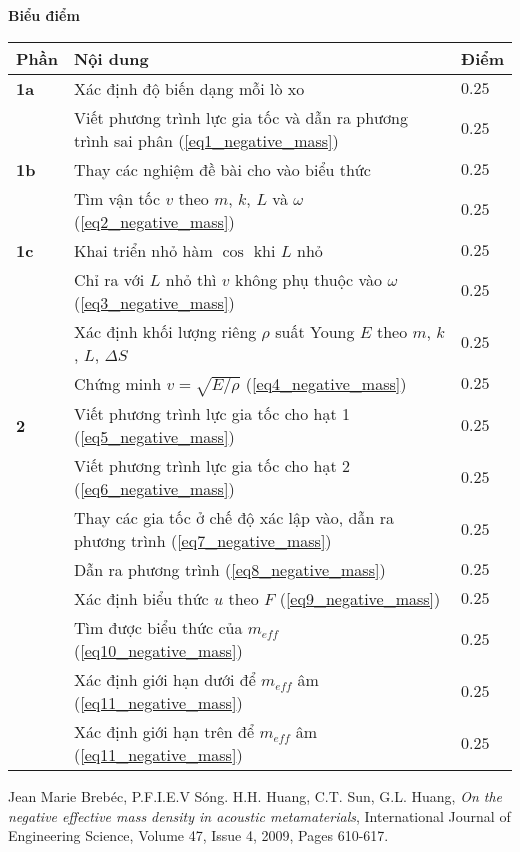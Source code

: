 \textbf{Biểu điểm}
\begin{center}
\begin{tabular}{|>{\centering\arraybackslash}m{1cm}|>{\raggedright\arraybackslash}m{14cm}| >{\centering\arraybackslash}m{1cm}|}
    \hline
    \textbf{Phần} & \textbf{Nội dung} & \textbf{Điểm} \\
    \hline
    \textbf{1a} & Xác định độ biến dạng mỗi lò xo & $0.25$ \\
    \cline{2-3}
    & Viết phương trình lực gia tốc và dẫn ra phương trình sai phân (\ref{eq1_negative_mass}) & $0.25$ \\
    \hline
    \textbf{1b} & Thay các nghiệm đề bài cho vào biểu thức & $0.25$ \\
    \cline{2-3} 
    & Tìm vận tốc $v$ theo $m$, $k$, $L$ và $\omega$ (\ref{eq2_negative_mass}) & $0.25$ \\
    \hline
    \textbf{1c} & Khai triển nhỏ hàm $\cos$ khi $L$ nhỏ & $0.25$ \\
    \cline{2-3}
    & Chỉ ra với $L$ nhỏ thì $v$ không phụ thuộc vào $\omega$ (\ref{eq3_negative_mass}) & $0.25$ \\
    \cline{2-3}
    & Xác định khối lượng riêng $\rho$ suất Young $E$ theo $m$, $k$, $L$, $\Delta S$ & $0.25$ \\
    \cline{2-3}
    & Chứng minh $v=\sqrt{E/\rho}$ (\ref{eq4_negative_mass}) & $0.25$ \\
    \hline
    \textbf{2} & Viết phương trình lực gia tốc cho hạt 1 (\ref{eq5_negative_mass}) & $0.25$ \\
    \cline{2-3}
    & Viết phương trình lực gia tốc cho hạt 2 (\ref{eq6_negative_mass}) & $0.25$ \\
    \cline{2-3}
    & Thay các gia tốc ở chế độ xác lập vào, dẫn ra phương trình (\ref{eq7_negative_mass}) & $0.25$ \\
    \cline{2-3}
    & Dẫn ra phương trình (\ref{eq8_negative_mass}) & $0.25$ \\ 
    \cline{2-3}
    & Xác định biểu thức $u$ theo $F$ (\ref{eq9_negative_mass}) & $0.25$ \\
    \cline{2-3} 
    & Tìm được biểu thức của $m_{eff}$ (\ref{eq10_negative_mass}) & $0.25$ \\
    \cline{2-3}
    & Xác định giới hạn dưới để $m_{eff}$ âm (\ref{eq11_negative_mass}) & $0.25$ \\
    \cline{2-3}
    & Xác định giới hạn trên để $m_{eff}$ âm (\ref{eq11_negative_mass}) & $0.25$ \\
    \hline
\end{tabular}
\end{center}


\begin{thebibliography}{}
 Jean Marie Brebéc, P.F.I.E.V Sóng.
 H.H. Huang, C.T. Sun, G.L. Huang, \textit{On the negative effective mass density in acoustic metamaterials}, International Journal of Engineering Science, Volume 47, Issue 4, 2009, Pages 610-617.
\end{thebibliography}


